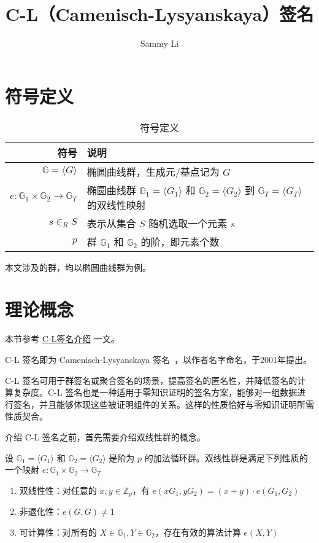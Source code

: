 \documentclass[a4paper,10pt]{article}
\title{C-L（Camenisch-Lysyanskaya）签名}
\date{\DTMdate{2021-01-12}}
\author{Sammy Li}
\newcommand{\bG}{\mathbb{G}}
\newcommand{\bZ}{\mathbb{Z}}
\begin{document}
\maketitle

\tableofcontents

\section{符号定义}
\begin{table}[!htbp]
  \centering
  \caption{符号定义}
  \begin{tabular}{|r|l|}
    \hline
    符号 & 说明 \\
    \hline
    \(\bG=\langle G\rangle\) & 椭圆曲线群，生成元/基点记为 \(G\) \\
    \(e: \bG_1\times \bG_2\rightarrow\bG_T\) & 椭圆曲线群 \(\bG_1=\langle G_1\rangle\) 和 \(\bG_2=\langle G_2\rangle\) 到 \(\bG_T=\langle G_T\rangle\) 的双线性映射 \\
    \(s\in_R S\) & 表示从集合 \(S\) 随机选取一个元素 \(s\) \\ 
    \(p\) & 群 \(\bG_1\) 和 \(\bG_2\) 的阶，即元素个数 \\
    \hline
  \end{tabular} 
\end{table}

本文涉及的群，均以椭圆曲线群为例。

\section{理论概念}
本节参考 \href{https://blog.csdn.net/zxzxzxzx2121/article/details/82149010}{C-L签名介绍} 一文。

C-L 签名即为 Camenisch-Lysyanskaya 签名~\cite{2003A}，以作者名字命名，于2001年提出。

C-L 签名可用于群签名或聚合签名的场景，提高签名的匿名性，并降低签名的计算复杂度。C-L 签名也是一种适用于零知识证明的签名方案，能够对一组数据进行签名，并且能够体现这些被证明组件的关系。这样的性质恰好与零知识证明所需性质契合。

介绍 C-L 签名之前，首先需要介绍双线性群的概念。

设 \(\bG_1=\langle G_1\rangle\) 和 \(\bG_2=\langle G_2\rangle\) 是阶为 \(p\) 的加法循环群。双线性群是满足下列性质的一个映射 \(e: \bG_1\times \bG_2\rightarrow\bG_T\)

\begin{enumerate}
  \item 双线性性：对任意的 \(x,y\in\bZ_p\)，有 \(e(xG_1,yG_2)=(x+y)\cdot e(G_1,G_2)\)
  \item 非退化性：\(e(G,G)\neq 1\)
  \item 可计算性：对所有的 \(X\in\bG_1,Y\in\bG_2\)，存在有效的算法计算 \(e(X,Y)\)
\end{enumerate}
\end{document}
